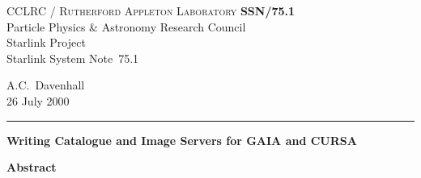 \documentclass[twoside,11pt]{article}
\newcommand{\stardoccategory}  {Starlink System Note}
\newcommand{\stardocinitials}  {SSN}
\newcommand{\stardocnumber}    {75.1}
\newcommand{\stardocauthors}   {A.C.~Davenhall}
\newcommand{\stardocdate}      {26 July 2000}
\newcommand{\stardoctitle}     {Writing Catalogue and Image Servers for
GAIA and CURSA}
\newcommand{\stardocname}{\stardocinitials /\stardocnumber}
\newenvironment{latexonly}{}{}
\renewcommand{\_}{\texttt{\symbol{95}}}
\begin{document}
\thispagestyle{empty}

\begin{latexonly}
   CCLRC / \textsc{Rutherford Appleton Laboratory} \hfill \textbf{\stardocname}\\
   {\large Particle Physics \& Astronomy Research Council}\\
   {\large Starlink Project\\}
   {\large \stardoccategory\ \stardocnumber}
   \begin{flushright}
   \stardocauthors\\
   \stardocdate
   \end{flushright}
   \vspace{-4mm}
   \rule{\textwidth}{0.5mm}
   \vspace{5mm}
   \begin{center}
   {\Large\textbf{\stardoctitle}}
   \end{center}
   \vspace{5mm}

   \vspace{10mm}
   \begin{center}
      {\Large\textbf{Abstract}}
   \end{center}
\end{latexonly}
\end{document}
